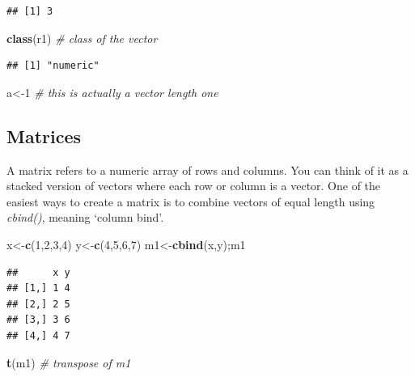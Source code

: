\documentclass[12pt,]{krantz}
\newenvironment{Shaded}{\begin{snugshade}}{\end{snugshade}}
\newcommand{\CommentTok}[1]{\textcolor[rgb]{0.56,0.35,0.01}{\textit{#1}}}
\newcommand{\DecValTok}[1]{\textcolor[rgb]{0.00,0.00,0.81}{#1}}
\newcommand{\KeywordTok}[1]{\textcolor[rgb]{0.13,0.29,0.53}{\textbf{#1}}}
\newcommand{\NormalTok}[1]{#1}
\theoremstyle{definition}
\theoremstyle{definition}
\theoremstyle{definition}
\theoremstyle{remark}
\begin{document}
\begin{verbatim}
## [1] 3
\end{verbatim}

\begin{Shaded}
\begin{Highlighting}[]
\KeywordTok{class}\NormalTok{(r1)            }\CommentTok{# class of the vector}
\end{Highlighting}
\end{Shaded}

\begin{verbatim}
## [1] "numeric"
\end{verbatim}

\begin{Shaded}
\begin{Highlighting}[]
\NormalTok{a<-}\DecValTok{1}                \CommentTok{# this is actually a vector length one}
\end{Highlighting}
\end{Shaded}

\hypertarget{matrices}{%
\subsection{Matrices}\label{matrices}}

A matrix refers to a numeric array of rows and columns. You can think of
it as a stacked version of vectors where each row or column is a vector.
One of the easiest ways to create a matrix is to combine vectors of
equal length using \emph{cbind()}, meaning `column bind'.

\begin{Shaded}
\begin{Highlighting}[]
\NormalTok{x<-}\KeywordTok{c}\NormalTok{(}\DecValTok{1}\NormalTok{,}\DecValTok{2}\NormalTok{,}\DecValTok{3}\NormalTok{,}\DecValTok{4}\NormalTok{)}
\NormalTok{y<-}\KeywordTok{c}\NormalTok{(}\DecValTok{4}\NormalTok{,}\DecValTok{5}\NormalTok{,}\DecValTok{6}\NormalTok{,}\DecValTok{7}\NormalTok{)}
\NormalTok{m1<-}\KeywordTok{cbind}\NormalTok{(x,y);m1}
\end{Highlighting}
\end{Shaded}

\begin{verbatim}
##      x y
## [1,] 1 4
## [2,] 2 5
## [3,] 3 6
## [4,] 4 7
\end{verbatim}

\begin{Shaded}
\begin{Highlighting}[]
\KeywordTok{t}\NormalTok{(m1)                }\CommentTok{# transpose of m1}
\end{Highlighting}
\end{Shaded}
\end{document}
